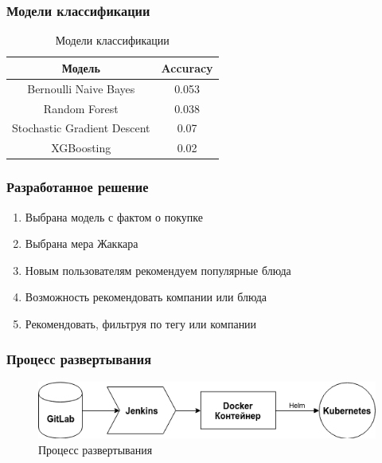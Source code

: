 \documentclass[10pt, unicode]{beamer}
\begin{document}
\begin{frame}
  \frametitle{Модели классификации}
  \begin{table}[H]
    \centering
    \begin{tabular} { | c | c | }
      \hline
      Модель & Accuracy \\
      \hline
      Bernoulli Naive Bayes & 0.053 \\
      Random Forest & 0.038 \\
      Stochastic Gradient Descent & 0.07 \\
      XGBoosting & 0.02 \\
      \hline
    \end{tabular}
    \caption{Модели классификации}
  \end{table}
\end{frame}

\begin{frame}
  \frametitle{Разработанное решение}
  \begin{enumerate}
    \item Выбрана модель с фактом о покупке
    \item Выбрана мера Жаккара
    \item Новым пользователям рекомендуем популярные блюда
    \item Возможность рекомендовать компании или блюда
    \item Рекомендовать, фильтруя по тегу или компании
  \end{enumerate}
\end{frame}

\begin{frame}
  \frametitle{Процесс развертывания}
  \begin{figure}[H]
    \centering
    \includegraphics[scale=0.5]{images/deploy.png}
    \caption{Процесс развертывания}
  \end{figure}
\end{frame}
\end{document}
